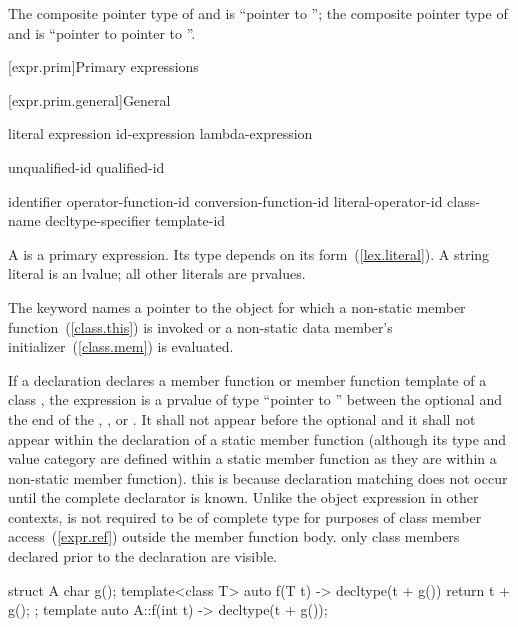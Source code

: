 The composite pointer type of  and  is ``pointer to ''; the
composite pointer type of  and  is ``pointer to  pointer to
''.
\exitexample

[expr.prim]{Primary expressions}%

[expr.prim.general]{General}

\begin{bnf}
\br
    literal\br
    \br
    \terminal{(} expression \terminal{)}\br
    id-expression\br
    lambda-expression
\end{bnf}

\begin{bnf}
\br
    unqualified-id\br
    qualified-id
\end{bnf}

\begin{bnf}
\br
    identifier\br
    operator-function-id\br
    conversion-function-id\br
    literal-operator-id\br
    \terminal{\tilde} class-name\br
    \terminal{\tilde} decltype-specifier\br
    template-id
\end{bnf}

\pnum
A
%
%
is a primary expression.
Its type depends on its form~(\ref{lex.literal}).
A string literal is an lvalue; all other literals are prvalues.

\pnum
{}%
The keyword  names a pointer to the object for which a non-static member
function~(\ref{class.this}) is invoked or a non-static data member's
initializer~(\ref{class.mem}) is evaluated.

\pnum
If a declaration declares a member function or member function template of a
class , the expression  is a prvalue of type ``pointer to
 '' between the optional
 and the end of the ,
, or . It shall not appear
before the optional  and it shall not appear within
the declaration of a static member function (although its type and value category
are defined within a static member function as they are within a non-static
member function). \enternote this is because declaration matching does not
occur until the complete declarator is known. \exitnote Unlike the object
expression in other contexts,  is not required to be of complete
type for purposes of class member access~(\ref{expr.ref}) outside the member
function body. \enternote only class members declared prior to the declaration
are visible. \exitnote
\enterexample
\begin{codeblock}
struct A {
  char g();
  template<class T> auto f(T t) -> decltype(t + g())
    { return t + g(); }
};
template auto A::f(int t) -> decltype(t + g());
\end{codeblock}
\exitexample

